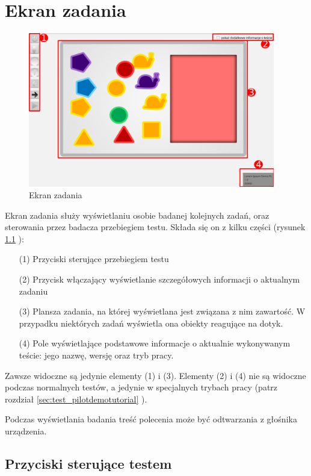 \documentclass[a4paper,10pt,twosided]{book}
\newcommand{\refwithpage}[3]{
\ref{#1}\ifthenelse{\equal{\thepage}{\pageref{#1}}}{}{#2\pageref{#1}#3}%
}
\newcommand{\ppref}[1]{\refwithpage{#1}{ -- strona }{}}
\begin{document}
\chapter{Ekran zadania}
\label{chap:test}

\begin{figure}[b!]
\includegraphics[width=0.96\textwidth]{test.pdf}
\caption{Ekran zadania}
\label{fig:test}
\end{figure}

Ekran zadania służy wyświetlaniu osobie badanej kolejnych zadań, oraz sterowania przez badacza przebiegiem testu. Składa się on z kilku części (rysunek \ppref{fig:test}):

\begin{enumerate}
\item[(1)] Przyciski sterujące przebiegiem testu
\item[(2)] Przycisk włączający wyświetlanie szczegółowych informacji o aktualnym zadaniu
\item[(3)] Plansza zadania, na której wyświetlana jest związana z nim zawartość. W przypadku niektórych zadań wyświetla ona obiekty reagujące na dotyk.
\item[(4)] Pole wyświetlające podstawowe informacje o aktualnie wykonywanym teście: jego nazwę, wersję oraz tryb pracy.
\end{enumerate}

Zawsze widoczne są jedynie elementy (1) i (3). Elementy (2) i (4) nie są widoczne podczas normalnych testów, a jedynie w specjalnych trybach pracy (patrz rozdział \ppref{sec:test_pilotdemotutorial}).

Podczas wyświetlania badania treść polecenia może być odtwarzania z głośnika urządzenia.


\section{Przyciski sterujące testem}
\label{sec:test_buttons}
\end{document}
